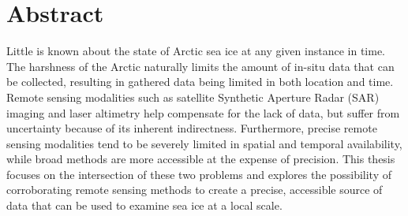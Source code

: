 
\chapter*{Abstract}

\indent Little is known about the state of Arctic sea ice at any given instance in time. The harshness of the Arctic naturally limits the amount of in-situ data that can be collected, resulting in gathered data being limited in both location and time. Remote sensing modalities such as satellite Synthetic Aperture Radar (SAR) imaging and laser altimetry help compensate for the lack of data, but suffer from uncertainty because of its inherent indirectness. Furthermore, precise remote sensing modalities tend to be severely limited in spatial and temporal availability, while broad methods are more accessible at the expense of precision. This thesis focuses on the intersection of these two problems and explores the possibility of corroborating remote sensing methods to create a precise, accessible source of data that can be used to examine sea ice at a local scale.
\par

